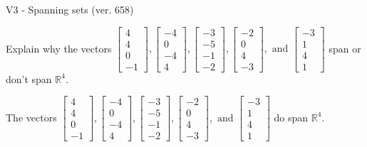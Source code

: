 \begin{exercise}
  \begin{exerciseTitle}V3 - Spanning sets (ver. 658)\end{exerciseTitle}
  \begin{exerciseStatement}
    Explain why the vectors \(\left[\begin{array}{r}
4 \\
4 \\
0 \\
-1
\end{array}\right] , \left[\begin{array}{r}
-4 \\
0 \\
-4 \\
4
\end{array}\right] , \left[\begin{array}{r}
-3 \\
-5 \\
-1 \\
-2
\end{array}\right] , \left[\begin{array}{r}
-2 \\
0 \\
4 \\
-3
\end{array}\right] , \text{ and } \left[\begin{array}{r}
-3 \\
1 \\
4 \\
1
\end{array}\right]\) span or don't span \(\mathbb{R}^4\). 
	


  \end{exerciseStatement}
  \begin{exerciseAnswer}
   The vectors \(\left[\begin{array}{r}
4 \\
4 \\
0 \\
-1
\end{array}\right] , \left[\begin{array}{r}
-4 \\
0 \\
-4 \\
4
\end{array}\right] , \left[\begin{array}{r}
-3 \\
-5 \\
-1 \\
-2
\end{array}\right] , \left[\begin{array}{r}
-2 \\
0 \\
4 \\
-3
\end{array}\right] , \text{ and } \left[\begin{array}{r}
-3 \\
1 \\
4 \\
1
\end{array}\right]\) 
  	 do  
	span \(\mathbb{R}^4\).
  



\end{exerciseAnswer}
\end{exercise}
